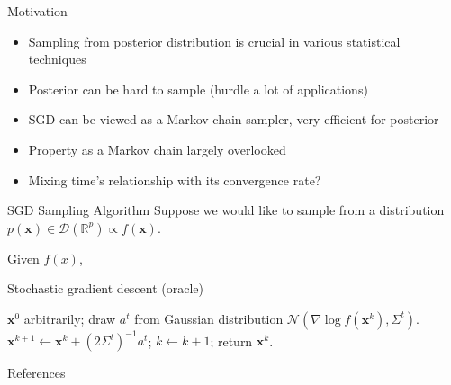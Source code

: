 \documentclass[final]{beamer}
\newlength{\onecolwid}
\newcommand{\bx}{\mathbf{x}}
\newcommand{\R}{\mathbb{R}}
\newcommand{\D}{\mathscr{D}}
\newcommand{\N}{\mathscr{N}}
\begin{document}
\begin{frame}[t]
\begin{columns}[t]
\begin{column}{\onecolwid}
\begin{block}{Motivation}
\begin{itemize}
\item Sampling from posterior distribution is crucial in various statistical techniques
\item Posterior can be hard to sample (hurdle a lot of applications)
\item SGD can be viewed as a Markov chain sampler, very efficient for posterior
\item Property as a Markov chain largely overlooked
\item Mixing time's relationship with its convergence rate?
\end{itemize}

\end{block}

%

\begin{block}{SGD Sampling Algorithm}
Suppose we would like to sample from a distribution $p(\bx)\in \D(\R^p) \propto f(\bx)$.
\begin{algorithm}[H]
{\small
Given $f(x)$,
\begin{algorithmic}\caption{Stochastic gradient descent (oracle)}\label{Alg:SGD}
 $ \bx^0$ arbitrarily;
\STATE draw $a^t$ from Gaussian distribution $\N(\nabla \log f(\bx^k), \Sigma^{t})$.
\STATE
$\bx^{k+1} \gets \bx^k + (2\Sigma^t)^{-1} a^t$;
\STATE $k\gets k+1$;
\ENDWHILE
\STATE return $\bx^k$.
\end{algorithmic}}
\end{algorithm}


\end{block}


\begin{block}{References}

\nocite{*} %
\small{
\vspace{0.75in}}

\end{block}


\end{column}
\end{columns}
\end{frame}
\end{document}
